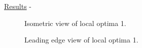 \begin{frame}[allowframebreaks]{\underline{Results} -}
\parbox{0.47\linewidth}{
\begin{figure} 
    \centering
    \caption{Isometric view of local optima 1.}
    \label{isoview_localoptima_1}
\end{figure}
}
\parbox{0.47\linewidth}{
\begin{figure} 
    \centering
    \caption{Leading edge view of local optima 1.}
    \label{frontview_localoptima_1}
\end{figure}
}
\begin{figure} 
  \parbox{0.47\linewidth}{
    \centering
}
\end{figure}
\end{frame}
